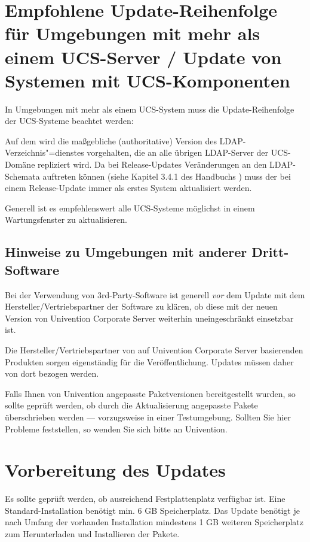 \chapter{Empfohlene Update-Reihenfolge für Umgebungen mit mehr als einem UCS-Server / Update von Systemen mit UCS-Komponenten}

In Umgebungen mit mehr als einem UCS-System muss die Update-Reihenfolge der
UCS-Systeme beachtet werden:

Auf dem \ucsMaster{} wird die maßgebliche (authoritative) Version des
LDAP-Verzeichnis"=dienstes vorgehalten, die an alle übrigen LDAP-Server
der UCS-Domäne repliziert wird. Da bei Release-Updates Veränderungen
an den LDAP-Schemata auftreten können (siehe
Kapitel 3.4.1 des Handbuchs \cite{UCS-Handbuch}) muss der \ucsMaster{} bei einem
Release-Update immer als erstes System aktualisiert werden.

Generell ist es empfehlenswert alle UCS-Systeme möglichst in einem
Wartungsfenster zu aktualisieren.

\section{Hinweise zu Umgebungen mit anderer Dritt-Software}

Bei der Verwendung von 3rd-Party-Software ist generell \emph{vor} dem Update
mit dem Hersteller/Vertriebspartner der Software zu klären, ob
diese mit der neuen Version von Univention Corporate Server weiterhin
uneingeschränkt einsetzbar ist. 

Die Hersteller/Vertriebspartner von auf Univention Corporate Server
basierenden Produkten sorgen eigenständig für die Veröffentlichung. Updates
müssen daher von dort bezogen werden.

Falls Ihnen von Univention angepasste Paketversionen bereitgestellt wurden, so
sollte geprüft werden, ob durch die Aktualisierung angepasste Pakete
überschrieben werden --- vorzugsweise in einer Testumgebung. Sollten Sie hier
Probleme feststellen, so wenden Sie sich bitte an Univention.

\chapter{Vorbereitung des Updates}
Es sollte geprüft werden, ob ausreichend Festplattenplatz verfügbar ist. Eine
Standard-Installation benötigt min. 6 GB Speicherplatz. Das
Update benötigt je nach Umfang der vorhanden Installation mindestens 1 GB
weiteren Speicherplatz zum Herunterladen und Installieren der Pakete.

